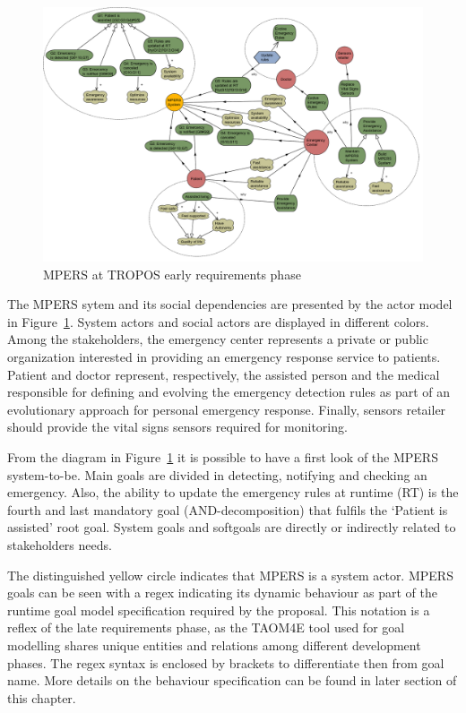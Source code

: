 \begin{figure}[ht!]
\centering
\includegraphics[width=1\textwidth]{imgs/MPERS_ER.png}
\caption{MPERS at TROPOS early requirements phase}
\label{fig:MPERS_ER}
\end{figure}

The MPERS sytem and its social dependencies are presented by the actor model in Figure~\ref{fig:MPERS_ER}. System actors and social actors are displayed in different colors. Among the stakeholders, the emergency center represents a private or public organization interested in providing an emergency response service to patients. Patient and doctor represent, respectively, the assisted person and the medical responsible for defining and evolving the emergency detection rules as part of an evolutionary approach for personal emergency response. Finally, sensors retailer should provide the vital signs sensors required for monitoring.

From the diagram in Figure~\ref{fig:MPERS_ER} it is possible to have a first look of the MPERS system-to-be. Main goals are divided in detecting, notifying and checking an emergency. Also, the ability to update the emergency rules at runtime (RT) is the fourth and last mandatory goal (AND-decomposition) that fulfils the `Patient is assisted' root goal. System goals and softgoals are directly or indirectly related to stakeholders needs.

The distinguished yellow circle indicates that MPERS is a system actor. MPERS goals can be seen with a regex indicating its dynamic behaviour as part of the runtime goal model specification required by the proposal. This notation is a reflex of the late requirements phase, as the TAOM4E tool used for goal modelling shares unique entities and relations among different development phases. The regex syntax is enclosed by brackets to differentiate then from goal name. More details on the behaviour specification can be found in later section of this chapter.

